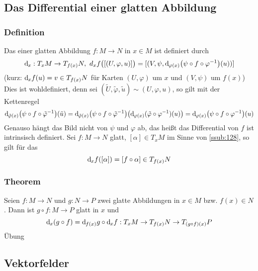 \subsection{Das Differential einer glatten Abbildung}
\label{sub:16}

\subsubsection[Definition: Differential]{Definition}
\label{ssub:139}
Das  einer glatten Abbildung $f:M\to N$ in $x\in M$ ist definiert durch
\[
\mathd_x :T_x M \to T_{f(x)} N,\ d_x f \enbrace[\big]{[(U,\varphi,u)]} = [(V,\psi,\mathd_{\varphi(x)} \enbrace*{\psi \circ f \circ \varphi^{-1}}(u))]
\]
(kurz: $\mathrm{d}\mkern-1.0mu_x f(u) = v\in T_{f(x)} N$ für Karten $(U,\varphi)$ um $x$ und $(V,\psi)$ um $f(x)$)\\
Dies ist wohldefiniert, denn sei $(\tilde{U},\tilde{\varphi},\tilde{u}) \sim (U,\varphi,u)$, so gilt mit der Kettenregel
\[
\mathd_{\tilde{\varphi}(x)} \enbrace*{\psi \circ f \circ \tilde{\varphi}^{-1}}\enbrace*{\tilde{u}} = 
\mathd_{\tilde{\varphi}(x)} \enbrace*{\psi \circ f \circ \tilde{\varphi}^{-1}}\enbrace*{\mathd_{\varphi(x)}(\tilde{\varphi} \circ \varphi^{-1})(u)} = 
\mathd_{\varphi(x)} \enbrace*{\psi \circ f \circ \varphi^{-1}}\enbrace*{u}
\]
Genauso hängt das Bild nicht von $\psi$ und $\varphi$ ab, das heißt das Differential von $f$ ist intrinsisch definiert.
Sei $f:M\to N$ glatt, $[\alpha]\in T_x M$ im Sinne von \ref{ssub:128}, so gilt für das 
\[
\mathrm{d}\mkern-1.0mu_x f([\alpha]) = [f\circ \alpha]\in T_{f(x)} N
\]

\subsubsection[Theorem:Kettenregel für Differentiale]{Theorem}
\label{ssub:140}
Seien $f:M\to N$ und $g:N\to P$ zwei glatte Abbildungen in $x\in M$ bzw. $f(x)\in N$. Dann ist $g\circ f: M\to P$ glatt in $x$ und 
\[
\mathrm{d}\mkern-1.0mu_x (g\circ f) = \mathrm{d}\mkern-1.0mu_{f(x)} g \circ \mathrm{d}\mkern-1.0mu_x f: T_x M \to T_{f(x)} N \to T_{(g\circ f)(x)} P
\]
Übung


\subsection{Vektorfelder}
\label{sub:17}

